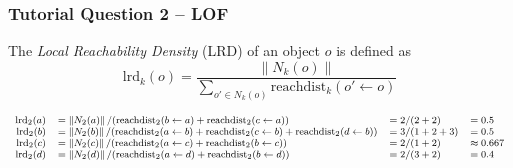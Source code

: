 \documentclass[aspectratio=169, 10pt]{beamer}
\newcommand{\norm}[1]{\left\lVert#1\right\rVert}
\begin{document}
\begin{frame}[t]
    \frametitle{Tutorial Question 2 -- LOF}
    
    The {\em Local Reachability Density} (LRD) of an object $o$ is defined as
    \[
        \text{lrd}_k(o) = \frac{\norm{N_k(o)}}{\sum_{o' \in N_k(o)} \text{reachdist}_k(o' \leftarrow o)}
        \]
        
    \begin{equation*}
        \footnotesize
        \begin{array}{rlll}
            \text{lrd}_2(a) & = \norm{N_2(a)} / (\text{reachdist}_2(b \leftarrow a) + \text{reachdist}_2(c \leftarrow a))                                      & = 2 / (2 + 2) & = 0.5\\
            \text{lrd}_2(b) & = \norm{N_2(b)} / (\text{reachdist}_2(a \leftarrow b) + \text{reachdist}_2(c \leftarrow b) + \text{reachdist}_2(d \leftarrow b)) & = 3 / (1 + 2 + 3)& = 0.5\\
            \text{lrd}_2(c) & = \norm{N_2(c)} / (\text{reachdist}_2(a \leftarrow c) + \text{reachdist}_2(b \leftarrow c))                                      & = 2 / (1 + 2) & \approx 0.667\\
            \text{lrd}_2(d) & = \norm{N_2(d)} / (\text{reachdist}_2(a \leftarrow d) + \text{reachdist}_2(b \leftarrow d))                                      & = 2 / (3 + 2) & = 0.4\\
        \end{array}
    \end{equation*}

\end{frame}
\end{document}

